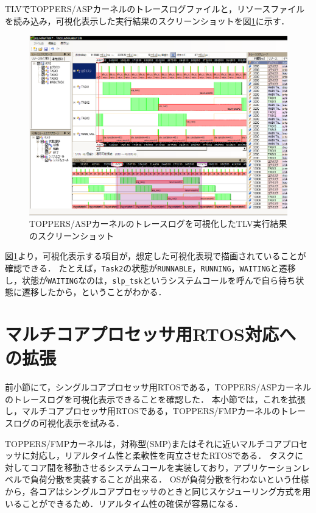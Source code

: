 TLVでTOPPERS/ASPカーネルのトレースログファイルと，リソースファイルを読み込み，可視化表示した実行結果のスクリーンショットを図\ref{fig:aspTLVscreenShot}に示す．

\begin{figure}[!h]
\begin{center}
\includegraphics[width=15cm]{img/aspTLVscreenShot.eps}
\caption{TOPPERS/ASPカーネルのトレースログを可視化したTLV実行結果のスクリーンショット}
\label{fig:aspTLVscreenShot}
\end{center}
\end{figure}

図\ref{fig:aspTLVscreenShot}より，可視化表示する項目が，想定した可視化表現で描画されていることが確認できる．
たとえば，{\tt Task2}の状態が{\tt RUNNABLE}，{\tt RUNNING}，{\tt WAITING}と遷移し，状態が{\tt WAITING}なのは，{\tt slp\_tsk}というシステムコールを呼んで自ら待ち状態に遷移したから，ということがわかる．

\section{マルチコアプロセッサ用RTOS対応への拡張}

前小節にて，シングルコアプロセッサ用RTOSである，TOPPERS/ASPカーネルのトレースログを可視化表示できることを確認した．
本小節では，これを拡張し，マルチコアプロセッサ用RTOSである，TOPPERS/FMPカーネルのトレースログの可視化表示を試みる．

TOPPERS/FMPカーネルは，対称型(SMP)またはそれに近いマルチコアプロセッサに対応し，リアルタイム性と柔軟性を両立させたRTOSである．
タスクに対してコア間を移動させるシステムコールを実装しており，アプリケーションレベルで負荷分散を実装することが出来る．
OSが負荷分散を行わないという仕様から，各コアはシングルコアプロセッサのときと同じスケジューリング方式を用いることができるため．リアルタイム性の確保が容易になる．

